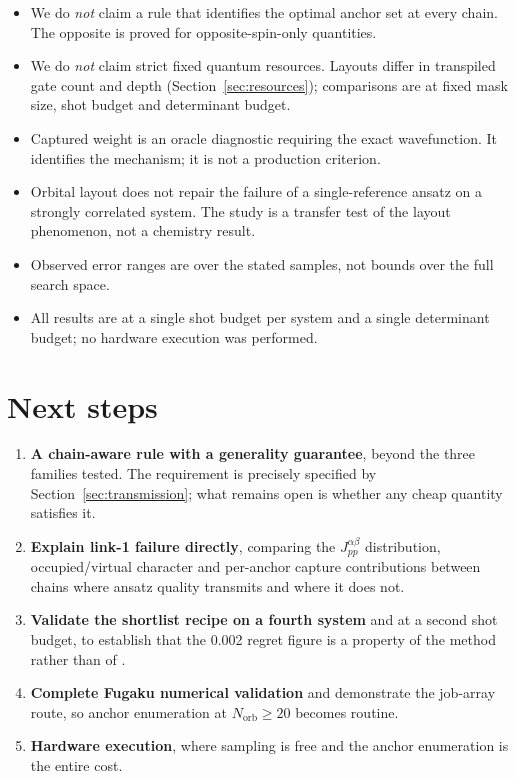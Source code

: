 \documentclass[11pt,a4paper]{article}
\begin{document}
\begin{itemize}\itemsep3pt
  \item We do \emph{not} claim a rule that identifies the optimal anchor set
        at every chain. The opposite is proved for opposite-spin-only
        quantities.
  \item We do \emph{not} claim strict fixed quantum resources. Layouts differ
        in transpiled gate count and depth (Section~\ref{sec:resources});
        comparisons are at fixed mask size, shot budget and determinant
        budget.
  \item Captured weight is an oracle diagnostic requiring the exact
        wavefunction. It identifies the mechanism; it is not a production
        criterion.
  \item Orbital layout does not repair the failure of a single-reference
        ansatz on a strongly correlated system. The  study is a
        transfer test of the layout phenomenon, not a chemistry result.
  \item Observed error ranges are over the stated samples, not bounds over
        the full search space.
  \item All results are at a single shot budget per system and a single
        determinant budget; no hardware execution was performed.
\end{itemize}

\section{Next steps}

\begin{enumerate}\itemsep3pt
  \item \textbf{A chain-aware rule with a generality guarantee}, beyond the
        three families tested. The requirement is precisely specified by
        Section~\ref{sec:transmission}; what remains open is whether any
        cheap quantity satisfies it.
  \item \textbf{Explain link-1 failure directly}, comparing the
        $J^{\alpha\beta}_{pp}$ distribution, occupied/virtual character and
        per-anchor capture contributions between chains where ansatz quality
        transmits and where it does not.
  \item \textbf{Validate the shortlist recipe on a fourth system} and at a
        second shot budget, to establish that the 0.002 regret figure is a
        property of the method rather than of .
  \item \textbf{Complete Fugaku numerical validation} and demonstrate the
        job-array route, so anchor enumeration at $N_{\text{orb}}\ge 20$
        becomes routine.
  \item \textbf{Hardware execution}, where sampling is free and the anchor
        enumeration is the entire cost.
\end{enumerate}
\end{document}
